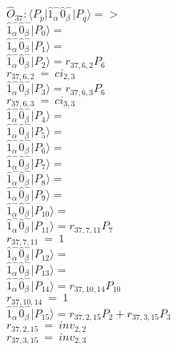 \documentclass[14pt]{article}
\begin{document}
    $\hat{O}_{37}:  \langle{P_p}\vert \hat{1}_{\alpha}^{-}\hat{0}_{\beta}^{-} \vert{P_q}\rangle => $ \\ 
    $ \hat{1}_{\alpha}^{-}\hat{0}_{\beta}^{-} \vert{P_{0}}\rangle =  $ \\ 
    $ \hat{1}_{\alpha}^{-}\hat{0}_{\beta}^{-} \vert{P_{1}}\rangle =  $ \\ 
    $ \hat{1}_{\alpha}^{-}\hat{0}_{\beta}^{-} \vert{P_{2}}\rangle = {r}_{37,6,2}P_{6} $ \\ 
    ${r}_{37,6,2}\ =\ {ci}_{2,3} $ \\ 
    $ \hat{1}_{\alpha}^{-}\hat{0}_{\beta}^{-} \vert{P_{3}}\rangle = {r}_{37,6,3}P_{6} $ \\ 
    ${r}_{37,6,3}\ =\ {ci}_{3,3} $ \\ 
    $ \hat{1}_{\alpha}^{-}\hat{0}_{\beta}^{-} \vert{P_{4}}\rangle =  $ \\ 
    $ \hat{1}_{\alpha}^{-}\hat{0}_{\beta}^{-} \vert{P_{5}}\rangle =  $ \\ 
    $ \hat{1}_{\alpha}^{-}\hat{0}_{\beta}^{-} \vert{P_{6}}\rangle =  $ \\ 
    $ \hat{1}_{\alpha}^{-}\hat{0}_{\beta}^{-} \vert{P_{7}}\rangle =  $ \\ 
    $ \hat{1}_{\alpha}^{-}\hat{0}_{\beta}^{-} \vert{P_{8}}\rangle =  $ \\ 
    $ \hat{1}_{\alpha}^{-}\hat{0}_{\beta}^{-} \vert{P_{9}}\rangle =  $ \\ 
    $ \hat{1}_{\alpha}^{-}\hat{0}_{\beta}^{-} \vert{P_{10}}\rangle =  $ \\ 
    $ \hat{1}_{\alpha}^{-}\hat{0}_{\beta}^{-} \vert{P_{11}}\rangle = {r}_{37,7,11}P_{7} $ \\ 
    ${r}_{37,7,11}\ =\ 1 $ \\ 
    $ \hat{1}_{\alpha}^{-}\hat{0}_{\beta}^{-} \vert{P_{12}}\rangle =  $ \\ 
    $ \hat{1}_{\alpha}^{-}\hat{0}_{\beta}^{-} \vert{P_{13}}\rangle =  $ \\ 
    $ \hat{1}_{\alpha}^{-}\hat{0}_{\beta}^{-} \vert{P_{14}}\rangle = {r}_{37,10,14}P_{10} $ \\ 
    ${r}_{37,10,14}\ =\ 1 $ \\ 
    $ \hat{1}_{\alpha}^{-}\hat{0}_{\beta}^{-} \vert{P_{15}}\rangle = {r}_{37,2,15}P_{2}+{r}_{37,3,15}P_{3} $ \\ 
    ${r}_{37,2,15}\ =\ {inv}_{2,2} $ \\ 
    ${r}_{37,3,15}\ =\ {inv}_{2,3} $ \\ 
    
\end{document}
